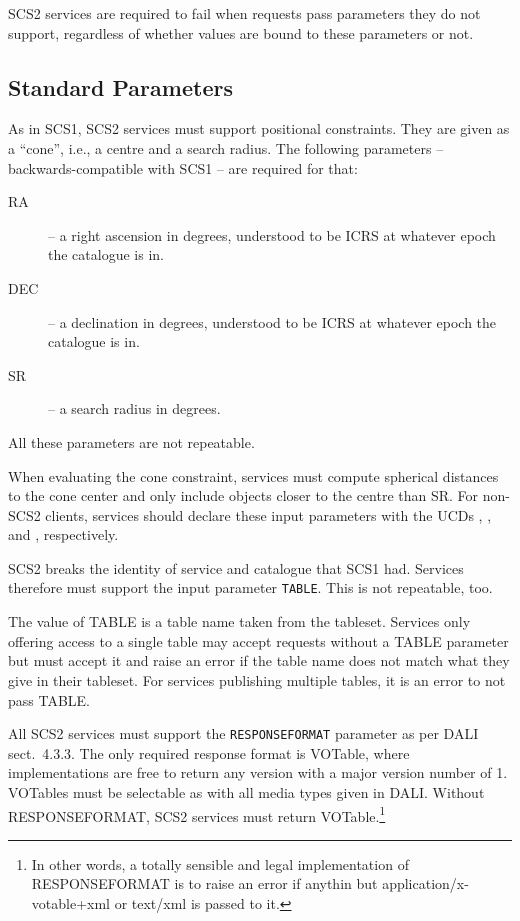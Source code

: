 \documentclass[11pt,a4paper]{ivoa}
\begin{document}
SCS2 services are required to fail when requests pass parameters they do
not support, regardless of whether values are bound to these parameters
or not.

\subsection{Standard Parameters}

As in SCS1, SCS2 services must support positional constraints.  They are
given as a ``cone'', i.e., a centre and a search radius.  The following
parameters -- backwards-compatible with SCS1 -- are required for that:

\begin{description}
\item[RA] -- a right ascension in degrees, understood to be ICRS at
whatever epoch the catalogue is in.
\item[DEC] -- a declination in degrees, understood to be ICRS at
whatever epoch the catalogue is in.
\item[SR] -- a search radius in degrees.
\end{description}

All these parameters are not repeatable.

When evaluating the cone constraint, services must compute spherical
distances to the cone center and only include objects closer to the
centre than SR.  For non-SCS2 clients, services should declare these
input parameters with the UCDs , , and
, respectively.

SCS2 breaks the identity of service and catalogue that SCS1 had.
Services therefore must support the input parameter \verb|TABLE|.  This
is not repeatable, too.

The value of TABLE is a table name taken from the tableset.  Services
only offering access to a single table may accept requests without a
TABLE parameter but must accept it and raise an error if the table name
does not match what they give in their tableset.  For services
publishing multiple tables, it is an error to not pass TABLE.

All SCS2 services must support the \verb|RESPONSEFORMAT| parameter as
per DALI sect.~4.3.3.  The only required response format is VOTable,
where implementations are free to return any version with a major
version number of 1.  VOTables must be selectable as with all media
types given in DALI.  Without RESPONSEFORMAT, SCS2 services must return
VOTable.\footnote{In other words, a totally sensible and legal
implementation of RESPONSEFORMAT is to raise an error if anythin but
application/x-votable+xml or text/xml is passed to it.}
\end{document}
